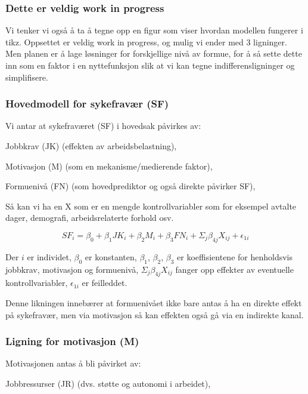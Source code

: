 \documentclass[
  12pt,
  a4paper,
  DIV=11,
  numbers=noendperiod]{scrartcl}
\begin{document}
\subsubsection{Dette er veldig work in
progress}\label{dette-er-veldig-work-in-progress}

Vi tenker vi også å ta å tegne opp en figur som viser hvordan modellen
fungerer i tikz. Oppsettet er veldig work in progress, og mulig vi ender
med 3 ligninger. Men planen er å lage løsninger for forskjellige nivå av
formue, for å så sette dette inn som en faktor i en nyttefunksjon slik
at vi kan tegne indifferensligninger og simplifisere.

\subsubsection{Hovedmodell for sykefravær
(SF)}\label{hovedmodell-for-sykefravuxe6r-sf}

Vi antar at sykefraværet (SF) i hovedsak påvirkes av:

Jobbkrav (JK) (effekten av arbeidsbelastning),

Motivasjon (M) (som en mekanisme/medierende faktor),

Formuenivå (FN) (som hovedprediktor og også direkte påvirker SF),

Så kan vi ha en X som er en mengde kontrollvariabler som for eksempel
avtalte dager, demografi, arbeidsrelaterte forhold osv.

\[
SF_i = \beta_0 + \beta_1 JK_i + \beta_2 M_i + \beta_3 FN_i + \Sigma_j \beta_{4j}X_{ij} + \epsilon_{1i}
\]

Der \(i\) er individet, \(\beta_0\) er konstanten, \(\beta_1\),
\(\beta_2\), \(\beta_3\) er koeffisientene for henholdsvis jobbkrav,
motivasjon og formuenivå, \(\Sigma_j \beta_{4j}X_{ij}\) fanger opp
effekter av eventuelle kontrollvariabler, \(\epsilon_{1i}\) er
feilleddet.

Denne likningen innebærer at formuenivået ikke bare antas å ha en
direkte effekt på sykefravær, men via motivasjon så kan effekten også gå
via en indirekte kanal.

\subsubsection{Ligning for motivasjon
(M)}\label{ligning-for-motivasjon-m}

Motivasjonen antas å bli påvirket av:

Jobbressurser (JR) (dvs. støtte og autonomi i arbeidet),
\end{document}
